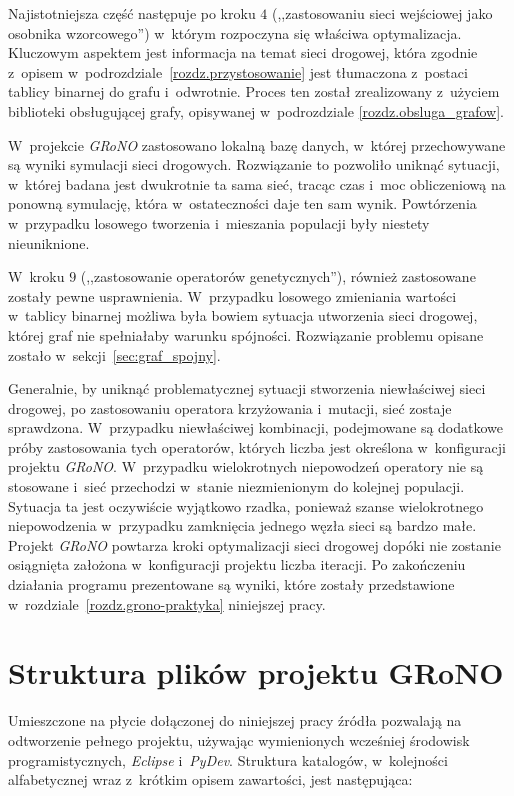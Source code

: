 \documentclass[twoside,12pt]{report}
\begin{document}
Najistotniejsza część następuje po kroku $4$ (,,zastosowaniu sieci wejściowej jako osobnika wzorcowego'') w~którym rozpoczyna się właściwa optymalizacja. Kluczowym aspektem jest informacja na temat sieci drogowej, która zgodnie z~opisem w~podrozdziale~\ref{rozdz.przystosowanie} jest tłumaczona z~postaci tablicy binarnej do grafu i~odwrotnie. Proces ten został zrealizowany z~użyciem biblioteki obsługującej grafy, opisywanej w~podrozdziale \ref{rozdz.obsluga_grafow}. 

W~projekcie \textit{GRoNO} zastosowano lokalną bazę danych, w~której przechowywane są wyniki symulacji sieci drogowych. Rozwiązanie to pozwoliło uniknąć sytuacji, w~której badana jest dwukrotnie ta sama sieć, tracąc czas i~moc obliczeniową na ponowną symulację, która w~ostateczności daje ten sam wynik. Powtórzenia w~przypadku losowego tworzenia i~mieszania populacji były niestety nieuniknione.

W~kroku $9$ (,,zastosowanie operatorów genetycznych''), również zastosowane zostały pewne usprawnienia. W~przypadku losowego zmieniania wartości w~tablicy binarnej możliwa była bowiem sytuacja utworzenia sieci drogowej, której graf nie spełniałaby warunku spójności. Rozwiązanie problemu opisane zostało w~sekcji~\ref{sec:graf_spojny}. 

Generalnie, by uniknąć problematycznej sytuacji stworzenia niewłaściwej sieci drogowej, po zastosowaniu operatora krzyżowania i~mutacji, sieć zostaje sprawdzona. W~przypadku niewłaściwej kombinacji, podejmowane są dodatkowe próby zastosowania tych operatorów, których liczba jest określona w~konfiguracji projektu \textit{GRoNO}. W~przypadku wielokrotnych niepowodzeń operatory nie są stosowane i~sieć przechodzi w~stanie niezmienionym do kolejnej populacji. Sytuacja ta jest oczywiście wyjątkowo rzadka, ponieważ szanse wielokrotnego niepowodzenia w~przypadku zamknięcia jednego węzła sieci są bardzo małe. Projekt \textit{GRoNO} powtarza kroki optymalizacji sieci drogowej dopóki nie zostanie osiągnięta założona w~konfiguracji projektu liczba iteracji. Po zakończeniu działania programu prezentowane są wyniki, które zostały przedstawione w~rozdziale~\ref{rozdz.grono-praktyka} niniejszej pracy.

\section{Struktura plików projektu GRoNO}
Umieszczone na płycie dołączonej do niniejszej pracy źródła pozwalają na odtworzenie pełnego projektu, używając wymienionych wcześniej środowisk programistycznych, \textit{Eclipse} i~\textit{PyDev}. Struktura katalogów, w~kolejności alfabetycznej wraz z~krótkim opisem zawartości, jest następująca:
\end{document}
